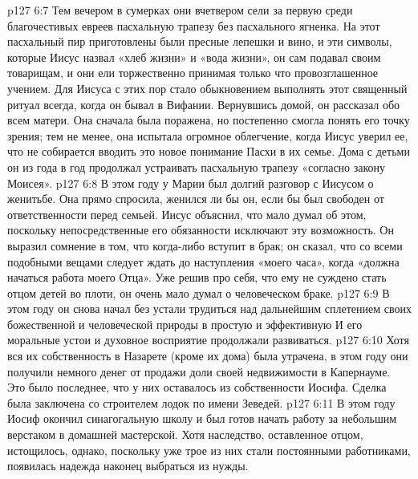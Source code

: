 \vs p127 6:7 Тем вечером в сумерках они вчетвером сели за первую среди благочестивых евреев пасхальную трапезу без пасхального ягненка. На этот пасхальный пир приготовлены были пресные лепешки и вино, и эти символы, которые Иисус назвал «хлеб жизни» и «вода жизни», он сам подавал своим товарищам, и они ели торжественно принимая только что провозглашенное учением. Для Иисуса с этих пор стало обыкновением выполнять этот священный ритуал всегда, когда он бывал в Вифании. Вернувшись домой, он рассказал обо всем матери. Она сначала была поражена, но постепенно смогла понять его точку зрения; тем не менее, она испытала огромное облегчение, когда Иисус уверил ее, что не собирается вводить это новое понимание Пасхи в их семье. Дома с детьми он из года в год продолжал устраивать пасхальную трапезу «согласно закону Моисея».
\vs p127 6:8 \pc В этом году у Марии был долгий разговор с Иисусом о женитьбе. Она прямо спросила, женился ли бы он, если бы был свободен от ответственности перед семьей. Иисус объяснил, что мало думал об этом, поскольку непосредственные его обязанности исключают эту возможность. Он выразил сомнение в том, что когда\hyp{}либо вступит в брак; он сказал, что со всеми подобными вещами следует ждать до наступления «моего часа», когда «должна начаться работа моего Отца». Уже решив про себя, что ему не суждено стать отцом детей во плоти, он очень мало думал о человеческом браке.
\vs p127 6:9 В этом году он снова начал без устали трудиться над дальнейшим сплетением своих божественной и человеческой природы в простую и эффективную  И его моральные устои и духовное восприятие продолжали развиваться.
\vs p127 6:10 Хотя вся их собственность в Назарете (кроме их дома) была утрачена, в этом году они получили немного денег от продажи доли своей недвижимости в Капернауме. Это было последнее, что у них оставалось из собственности Иосифа. Сделка была заключена со строителем лодок по имени Зеведей.
\vs p127 6:11 В этом году Иосиф окончил синагогальную школу и был готов начать работу за небольшим верстаком в домашней мастерской. Хотя наследство, оставленное отцом, истощилось, однако, поскольку уже трое из них стали постоянными работниками, появилась надежда наконец выбраться из нужды.
